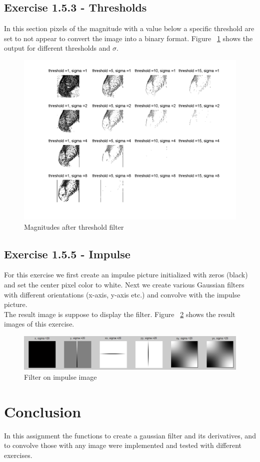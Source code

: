 \documentclass[11pt]{article}
\begin{document}
\subsection{Exercise 1.5.3 - Thresholds}
In this section pixels of the magnitude with a value below a specific threshold are set to not appear to convert the image into a binary format. Figure ~\ref{threshold} shows the output for different thresholds and $\sigma$.

\begin{figure}[h!]
\includegraphics[scale=0.6]{threshold.png}
\caption{Magnitudes after threshold filter}
\label{threshold}
\end{figure}

\subsection{Exercise 1.5.5 - Impulse}
For this exercise we first create an impulse picture initialized with zeros (black) and set the center pixel color to white. Next we create various Gaussian filters with different orientations (x-axis, y-axis etc.) and convolve with the impulse picture.\\
The result image is suppose to display the filter. Figure ~\ref{impulse} shows the result images of this exercise.

\begin{figure}[h!]
\includegraphics[scale=0.4]{impulse.png}
\caption{Filter on impulse image}
\label{impulse}
\end{figure}

\section{Conclusion}
In this assignment the functions to create a gaussian filter and its derivatives, and to convolve those with any image were implemented and tested with different exercises. 
\end{document}
